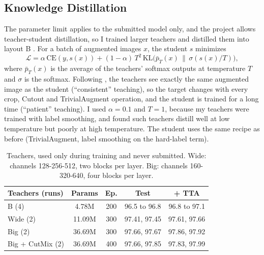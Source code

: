 \documentclass[letterpaper]{article}
\begin{document}
\subsection{Knowledge Distillation}
The parameter limit applies to the submitted model only, and the project allows teacher-student distillation, so I
trained larger teachers and distilled them into layout B \cite{hinton2015distilling}. For a batch of augmented
images $x$, the student $s$ minimizes
\begin{equation*}
\mathcal{L} = \alpha\,\mathrm{CE}(y, s(x)) + (1-\alpha)\,T^2\,\mathrm{KL}\big(\bar p_T(x)\,\|\,\sigma(s(x)/T)\big),
\end{equation*}
where $\bar p_T(x)$ is the average of the teachers' softmax outputs at temperature $T$ and $\sigma$ is the softmax.
Following \citet{beyer2022knowledge}, the teachers see exactly the same augmented image as the student
(``consistent'' teaching), so the target changes with every crop, Cutout and TrivialAugment operation, and the
student is trained for a long time (``patient'' teaching). I used $\alpha=0.1$ and $T=1$, because my teachers were
trained with label smoothing, and \citet{chandrasegaran2022revisiting} found such teachers distill well at low
temperature but poorly at high temperature. The student uses the same recipe as before (TrivialAugment, label
smoothing on the hard-label term).

\begin{table}[t]
\centering
\small
\setlength{\tabcolsep}{4pt}
\begin{tabular}{lcccc}
\toprule
Teachers (runs) & Params & Ep. & Test & + TTA \\
\midrule
B (4) & 4.78M & 200 & 96.5 to 96.8 & 96.8 to 97.1 \\
Wide (2) & 11.09M & 300 & 97.41, 97.45 & 97.61, 97.66 \\
Big (2) & 36.69M & 300 & 97.66, 97.67 & 97.86, 97.92 \\
Big + CutMix (2) & 36.69M & 400 & 97.66, 97.85 & 97.83, 97.99 \\
\bottomrule
\end{tabular}
\caption{Teachers, used only during training and never submitted. Wide: channels 128-256-512, two blocks per layer.
Big: channels 160-320-640, four blocks per layer.}
\label{tab:teachers}
\end{table}
\end{document}
